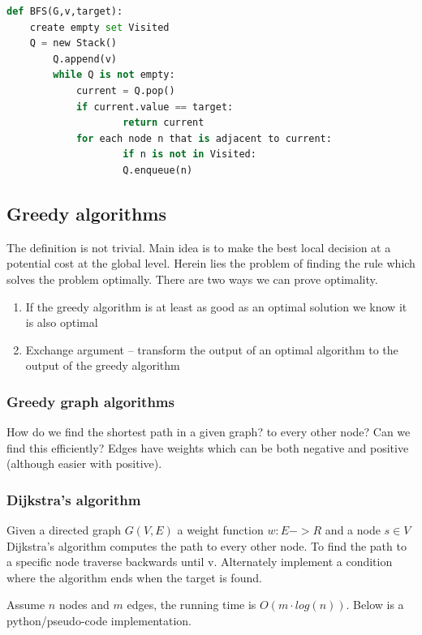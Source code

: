 \documentclass[12pt]{article} %
\begin{document}
\begin{lstlisting}[language=Python, caption=BFS in Python]
def BFS(G,v,target):
    create empty set Visited
    Q = new Stack()
        Q.append(v)                      
        while Q is not empty:
            current = Q.pop()
            if current.value == target:
                    return current
            for each node n that is adjacent to current:
                    if n is not in Visited:
                    Q.enqueue(n)
\end{lstlisting}

\subsection{Greedy algorithms} %
The definition is not trivial. Main idea is to make the best local decision at a potential cost at the global level. Herein lies the problem of finding the rule which solves the problem optimally. There are two ways we can prove optimality. 
\begin{enumerate}
\item If the greedy algorithm is at least as good as an optimal solution we know it is also optimal
\item Exchange argument -- transform the output of an optimal algorithm to the output of the greedy algorithm
\end{enumerate}

\subsubsection{Greedy graph algorithms}
How do we find the shortest path in a given graph? to every other node? Can we find this efficiently? Edges have weights which can be both negative and positive (although easier with positive).

\subsubsection{Dijkstra's algorithm}
Given a directed graph $G(V, E)$ a weight function $w: E -> R$ and a node $s \in V$ Dijkstra's algorithm computes the path to every other node. To find the path to a specific node traverse backwards until v. Alternately implement a condition where the algorithm ends when the target is found.
\par Assume $n$ nodes and $m$ edges, the running time is $O(m \cdot log(n))$. Below is a python/pseudo-code implementation.
\end{document}
